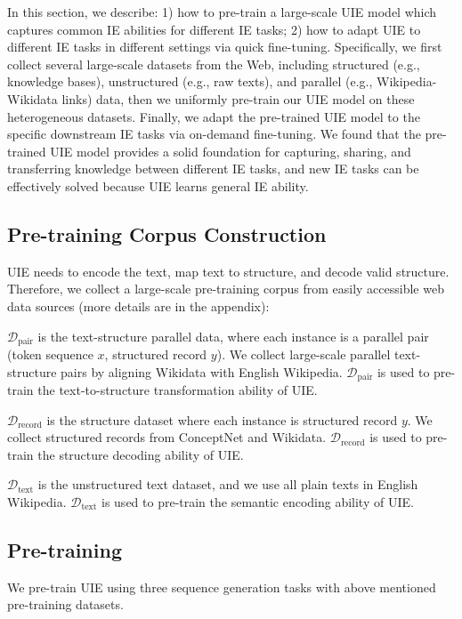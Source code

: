 \documentclass[11pt]{article}
\begin{document}
In this section, we describe:
1) how to pre-train a large-scale UIE model which captures common IE abilities for different IE tasks;
2) how to adapt UIE to different IE tasks in different settings via quick fine-tuning.
Specifically, we first collect several large-scale datasets from the Web, including structured (e.g., knowledge bases), unstructured (e.g., raw texts), and parallel (e.g., Wikipedia-Wikidata links) data, then we uniformly pre-train our UIE model on these heterogeneous datasets.
Finally, we adapt the pre-trained UIE model to the specific downstream IE tasks via on-demand fine-tuning.
We found that the pre-trained UIE model provides a solid foundation for capturing, sharing, and transferring knowledge between different IE tasks, and new IE tasks can be effectively solved because UIE learns general IE ability. 

\subsection{Pre-training Corpus Construction}
UIE needs to encode the text, map text to structure, and decode valid structure. 
Therefore, we collect a large-scale pre-training corpus from easily accessible web data sources (more details are in the appendix):

$\mathcal{D}_{\text{pair}}$ is the text-structure parallel data, where each instance is a parallel pair (token sequence $x$, structured record $y$).
We collect large-scale parallel text-structure pairs by aligning Wikidata with English Wikipedia.
$\mathcal{D}_{\text{pair}}$ is used to pre-train the text-to-structure transformation ability of UIE.

$\mathcal{D}_{\text{record}}$ is the structure dataset where each instance is structured record $y$.
We collect structured records from ConceptNet \cite{Speer_Chin_Havasi_2017} and Wikidata.
$\mathcal{D}_{\text{record}}$ is used to pre-train the structure decoding ability of UIE.

$\mathcal{D}_{\text{text}}$ is the unstructured text dataset, and we use all plain texts in English Wikipedia.
$\mathcal{D}_{\text{text}}$ is used to pre-train the semantic encoding ability of UIE.

\subsection{Pre-training}
\label{sec:tasks_for_pretraining}

We pre-train UIE using three sequence generation tasks with above mentioned pre-training datasets.
\end{document}
